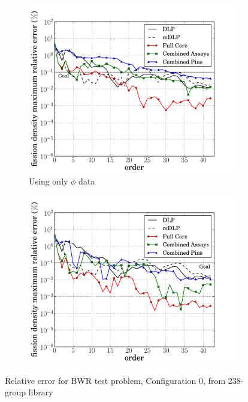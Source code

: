 \documentclass[5p,times,twocolumn,10pt]{elsarticle}
\begin{document}
    \begin{figure}[tb]
        \centering
        \begin{subfigure}{0.5\textwidth}
            \centering
            \includegraphics[trim=.1cm .25cm 2.0cm .4cm, clip=true,
            totalheight=0.261\textheight]
            {BWR0_238_energy_basis_comparison_fission-44}
            \caption{Using only $\phi$ data}
            \label{fig:core0-238a}
        \end{subfigure}%
        \begin{subfigure}{0.5\textwidth}
            \centering
            \includegraphics[trim=.1cm .25cm 2.0cm .4cm, clip=true,
            totalheight=0.261\textheight]
            {BWR0_238_partial_energy_basis_comparison_fission-44}
            \label{fig:core0-238b}
        \end{subfigure}
        \caption{Relative error for BWR test problem, Configuration 0, from
            238-group library}
        \label{fig:core0-238}
    \end{figure}
\end{document}
